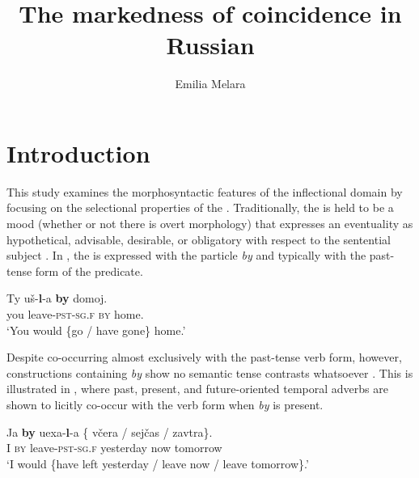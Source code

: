 \documentclass[output=paper,modfonts,newtxmath,hidelinks,]{langscibook}
\title{The markedness of coincidence in Russian}
\author{Emilia Melara\affiliation{University of Toronto}}
\begin{document}
\maketitle
{}



\section{Introduction}\label{10:s1}


This study examines the morphosyntactic features of the  inflectional domain by focusing on the selectional properties of the  . Traditionally, the  is held to be a mood (whether or not there is overt morphology) that expresses an eventuality as hypothetical, advisable, desirable, or obligatory with respect to the sentential subject  \citep[142]{HarrisonLeFleming2000}. In , the  is expressed with the particle \textit{by} and typically with the past-tense form of the predicate.

\ea \label{10:ex1}
\gll Ty uš-\textbf{l}{}-a \textbf{by} domoj.\\
     you leave\textsc{-pst-sg.f} \textsc{by} home.\\
\glt `You would \{go / have gone\} home.' \hfill \citep[152]{Mezhevich2006}
\z

\noindent Despite co-occurring almost exclusively with the past-tense verb form, however, constructions containing \textit{by} show no semantic tense contrasts whatsoever \citep[298]{Spencer2001}. This is illustrated in , where past, present, and future-oriented temporal adverbs are shown to licitly co-occur with the  verb form when \textit{by} is present. 

\ea \label{10:ex2}
\gll Ja \textbf{by} uexa-\textbf{l}{}-a \{\hspace{-2pt} včera / sejčas / zavtra\}.\\
     I \textsc{by} leave\textsc{-pst-sg.f} {} yesterday {} now {} tomorrow\\
\glt `I would \{have left yesterday / leave now / leave tomorrow\}.'\\
\hfill \citep[136]{Mezhevich2006}
\z
\end{document}
